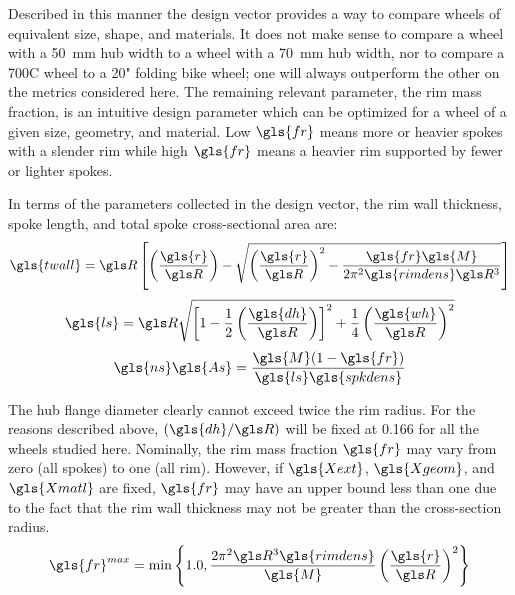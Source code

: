 \documentclass[\rootdir/thesis.tex]{subfiles}
\begin{document}
Described in this manner the design vector provides a way to compare wheels of equivalent size, shape, and materials. It does not make sense to compare a wheel with a \SI{50}{mm} hub width to a wheel with a \SI{70}{mm} hub width, nor to compare a 700C wheel to a 20" folding bike wheel; one will always outperform the other on the metrics considered here. The remaining relevant parameter, the rim mass fraction, is an intuitive design parameter which can be optimized for a wheel of a given size, geometry, and material. Low $\gls{fr}$ means more or heavier spokes with a slender rim while high $\gls{fr}$ means a heavier rim supported by fewer or lighter spokes.


In terms of the parameters collected in the design vector, the rim wall thickness, spoke length, and total spoke cross-sectional area are:
\begin{equation}
\label{eqn:design:t}
\gls{twall} = \R\left[ \left(\frac{\gls{r}}{\R}\right) - \sqrt{\left(\frac{\gls{r}}{\R}\right)^2 - \frac{\gls{fr}\gls{M}}{2\pi^2\gls{rimdens}\R^3}}\right]
\end{equation}
\begin{equation}
\label{eqn:design:ls}
\gls{ls} = \R\sqrt{\left[1-\frac{1}{2}\left(\frac{\gls{dh}}{\R}\right)\right]^2 + \frac{1}{4}\left(\frac{\gls{wh}}{\R}\right)^2}
\end{equation}
\begin{equation}
\label{eqn:design:nsAs}
\gls{ns}\gls{As} = \frac{\gls{M}(1-\gls{fr})}{\gls{ls}\gls{spkdens}}
\end{equation}

The hub flange diameter clearly cannot exceed twice the rim radius. For the reasons described above, $(\gls{dh}/\R)$ will be fixed at 0.166 for all the wheels studied here. Nominally, the rim mass fraction $\gls{fr}$ may vary from zero (all spokes) to one (all rim). However, if $\gls{Xext}$, $\gls{Xgeom}$, and $\gls{Xmatl}$ are fixed, $\gls{fr}$ may have an upper bound less than one due to the fact that the rim wall thickness may not be greater than the cross-section radius.
\begin{equation}
\label{eqn:frim_max}
\gls{fr}^{max} = \min\left\lbrace 1.0, \frac{2\pi^2 \R^3\gls{rimdens}}{\gls{M}}\left(\frac{\gls{r}}{\R}\right)^2 \right\rbrace
\end{equation}
\end{document}
